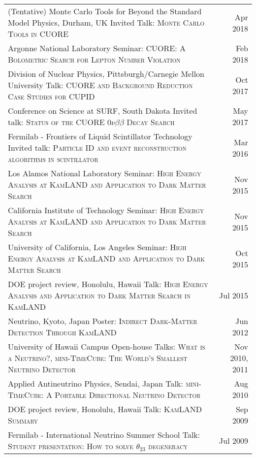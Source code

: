 \documentclass[10pt]{article} %
\begin{document}
\noindent\begin{tabularx}{\linewidth}{@{{}\textbullet\enskip}X@{\quad}r@{}}
	(Tentative) Monte Carlo Tools for Beyond the Standard Model Physics, Durham, UK \newline Invited Talk: \textsc{Monte Carlo Tools in CUORE} & Apr 2018 \\
	Argonne National Laboratory \newline Seminar: \textsc{CUORE: A Bolometric Search for Lepton Number Violation} & Feb 2018 \\
	Division of Nuclear Physics, Pittsburgh/Carnegie Mellon University \newline Talk: \textsc{CUORE and Background Reduction Case Studies for CUPID} & Oct 2017 \\
	Conference on Science at SURF, South Dakota \newline Invited talk: \textsc{Status of the CUORE $0\nu\beta\beta$ Decay Search} & May 2017 \\
	Fermilab - Frontiers of Liquid Scintillator Technology \newline Invited talk: \textsc{Particle ID and event reconstruction algorithms in scintillator} & Mar 2016 \\
	Los Alamos National Laboratory \newline Seminar: \textsc{High Energy Analysis at KamLAND and Application to Dark Matter Search} & Nov 2015 \\
	California Institute of Technology \newline Seminar: \textsc{High Energy Analysis at KamLAND and Application to Dark Matter Search} & Nov 2015 \\
	University of California, Los Angeles \newline Seminar: \textsc{High Energy Analysis at KamLAND and Application to Dark Matter Search} & Oct 2015 \\
	DOE project review, Honolulu, Hawaii \newline Talk: \textsc{High Energy Analysis and Application to Dark Matter Search in KamLAND} & Jul 2015 \\
	Neutrino, Kyoto, Japan \newline Poster: \textsc{Indirect Dark-Matter Detection Through KamLAND} & Jun 2012 \\
	University of Hawaii Campus Open-house \newline Talks: \textsc{What is a Neutrino?}, \textsc{mini-TimeCube: The World's Smallest Neutrino Detector} & Nov 2010, 2011 \\
	Applied Antineutrino Physics, Sendai, Japan \newline Talk: \textsc{mini-TimeCube: A Portable Directional Neutrino Detector} & Aug 2010 \\
	DOE project review, Honolulu, Hawaii \newline Talk: \textsc{KamLAND Summary} & Sep 2009 \\
	Fermilab - International Neutrino Summer School \newline Talk: \textsc{Student presentation: How to solve $\theta_{23}$ degeneracy} & Jul 2009 \\
\end{tabularx}
\end{document}
